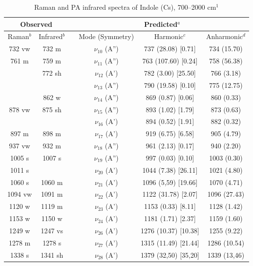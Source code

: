 	
	
	
		\begin{table}[H]
			\caption{Raman and PA infrared spectra of Indole (Cs), 700–2000 cm$^{1}$}
			\begin{center}
			\begin{tabular}{c c c c c c}
				\hline
				\multicolumn{ 2}{c}{Observed} & \multicolumn{1}{c}{} & \multicolumn{ 3}{c}{Predicted$^{a}$} \\ \hline
				Raman$^{b}$ & \multicolumn{1}{c}{Infrared$^{b}$} &  & \multicolumn{1}{c}{Mode (Symmetry)} & \multicolumn{1}{c}{Harmonic$^{c}$} & Anharmonic$^{d}$ \\ \hline
	732 vw & 732 m  &  & $\nu_{10}$ (A”) & 737 (28.08) [0.71] & 734 (15.70) \\ 
	761 m & 759 m &  & $\nu_{11}$ (A”) & 763 (107.60) [0.24] & 758 (56.38) \\ 
	& 772 sh &  & $\nu_{12}$ (A’) & 782 (3.00) [25.50] & 766 (3.18) \\ 
	&  &  & $\nu_{13}$ (A”) & 790 (19.58) [0.10] & 775 (12.75) \\ 
	& 862 w &  & $\nu_{14}$ (A”) & 869 (0.87) [0.06] & 860 (0.33) \\ 
	878 vw & 875 sh &  & $\nu_{15}$ (A”) & 893 (1.02) [1.79] & 873 (0.63) \\
	&  &  & $\nu_{16}$ (A’) & 894 (0.52) [1.91] & 882 (0.32) \\
	897 m & 898 m &  & $\nu_{17}$ (A’) & 919 (6.75) [6.58] & 905 (4.79) \\
	937 vw & 932 m &  & $\nu_{18}$ (A”) & 961 (2.13) [0.17] & 940 (2.20) \\ 
	1005 s & 1007 s &  & $\nu_{19}$ (A”) & 997 (0.03) [0.10] & 1003 (0.30) \\ 
	1011 s &  &  & $\nu_{20}$ (A’) & 1044 (7.38) [26.11] & 1021 (4.80) \\
	1060 s & 1060 m &  & $\nu_{21}$ (A’)& 1096 (5,59) [19.66] & 1070 (4.71)
	\\ 
		1094 vw & 1091 m &  & $\nu_{22}$ (A’)& 1122 (31.78) [2.07]	& 1096 (27.43)
		\\ 
		1120 w & 1119 m &  & \multicolumn{1}{c}{$\nu_{23}$ (A’)} & 1153 (0.33) [8.11] & 1128 (1.42) \\
		1153 w & 1150 w &  & $\nu_{24}$ (A’)
		& 1181 (1.71) [2.37]& 1159 (1.60)\\
		1249 w & 1247 vs &  & $\nu_{26}$ (A’) & 1276 (10.37) [10.38] & 1255 (9.22) \\ 
		1278 m & 1278 s &  & $\nu_{27}$ (A’) & 1315 (11.49) [21.44] &   1286 (10.54) \\ 
		1338 s & 1341 sh &  & \multicolumn{1}{c}{$\nu_{28}$ (A’)} & 1379 (32,50) [35,20] &  1339 (13,46) \\
	 \hline
\end{tabular}
\end{center}
\end{table}
	
